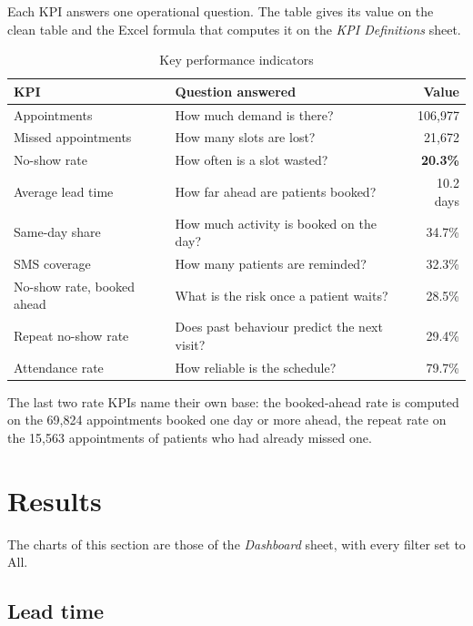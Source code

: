 \documentclass[12pt,a4paper]{article}
\begin{document}
Each KPI answers one operational question. The table gives its value on the clean table
and the Excel formula that computes it on the \emph{KPI Definitions} sheet.

\begin{table}[H]\centering\singlespacing
\caption{Key performance indicators}
\small
\begin{tabularx}{\linewidth}{@{}l>{\raggedright\arraybackslash}Xr@{}}
\toprule
\textbf{KPI} & \textbf{Question answered} & \textbf{Value} \\ \midrule
Appointments & How much demand is there? & 106{,}977 \\
Missed appointments & How many slots are lost? & 21{,}672 \\
No-show rate & How often is a slot wasted? & \textbf{20.3\%} \\
Average lead time & How far ahead are patients booked? & 10.2 days \\
Same-day share & How much activity is booked on the day? & 34.7\% \\
SMS coverage & How many patients are reminded? & 32.3\% \\
No-show rate, booked ahead & What is the risk once a patient waits? & 28.5\% \\
Repeat no-show rate & Does past behaviour predict the next visit? & 29.4\% \\
Attendance rate & How reliable is the schedule? & 79.7\% \\
\bottomrule
\end{tabularx}
\end{table}

The last two rate KPIs name their own base: the booked-ahead rate is computed on the
69{,}824 appointments booked one day or more ahead, the repeat rate on the 15{,}563
appointments of patients who had already missed one.

\section{Results}\label{sec:results}

The charts of this section are those of the \emph{Dashboard} sheet, with every filter set
to All.

\subsection{Lead time}
\end{document}
